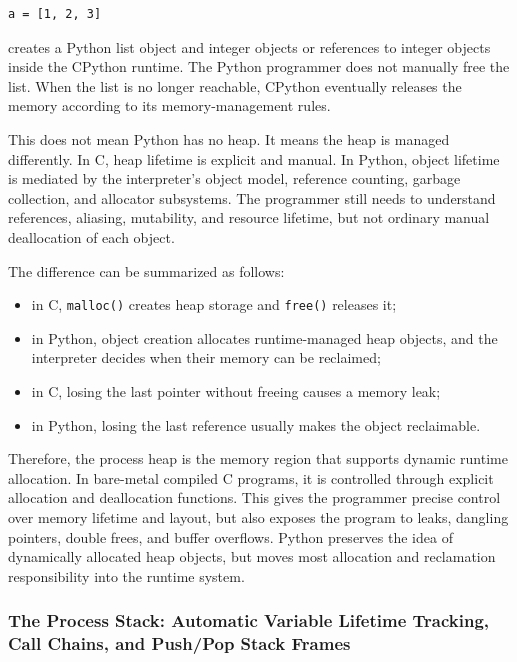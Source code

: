 \begin{verbatim}
a = [1, 2, 3]
\end{verbatim}

creates a Python list object and integer objects or references to integer objects inside the CPython runtime. The Python programmer does not manually free the list. When the list is no longer reachable, CPython eventually releases the memory according to its memory-management rules.

This does not mean Python has no heap. It means the heap is managed differently. In C, heap lifetime is explicit and manual. In Python, object lifetime is mediated by the interpreter's object model, reference counting, garbage collection, and allocator subsystems. The programmer still needs to understand references, aliasing, mutability, and resource lifetime, but not ordinary manual deallocation of each object.

The difference can be summarized as follows:

\begin{itemize}
    \item in C, \texttt{malloc()} creates heap storage and \texttt{free()} releases it;
    \item in Python, object creation allocates runtime-managed heap objects, and the interpreter decides when their memory can be reclaimed;
    \item in C, losing the last pointer without freeing causes a memory leak;
    \item in Python, losing the last reference usually makes the object reclaimable.
\end{itemize}

Therefore, the process heap is the memory region that supports dynamic runtime allocation. In bare-metal compiled C programs, it is controlled through explicit allocation and deallocation functions. This gives the programmer precise control over memory lifetime and layout, but also exposes the program to leaks, dangling pointers, double frees, and buffer overflows. Python preserves the idea of dynamically allocated heap objects, but moves most allocation and reclamation responsibility into the runtime system.

\subsubsection{The Process Stack: Automatic Variable Lifetime Tracking, Call Chains, and Push/Pop Stack Frames}


